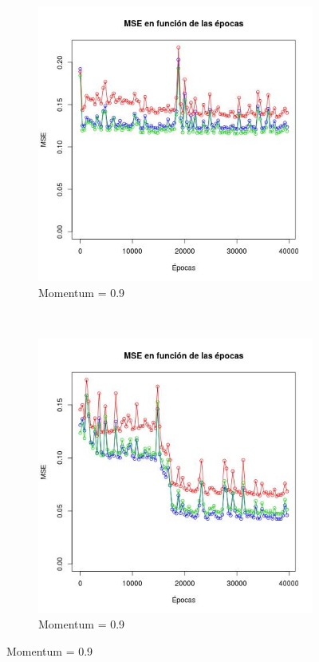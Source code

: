 \documentclass[12pt, a4paper]{article}
\begin{document}
\begin{figure}
    \centering

    \begin{subfigure}[b]{0.45\textwidth}
        \includegraphics[width=\textwidth]{mse32}
        \caption{Momentum = 0.9}
    \end{subfigure}
      ~ %
    \begin{subfigure}[b]{0.45\textwidth}
        \includegraphics[width=\textwidth]{mse32c}
        \caption{Momentum = 0.9}
    \end{subfigure}


\end{figure}
\end{document}
